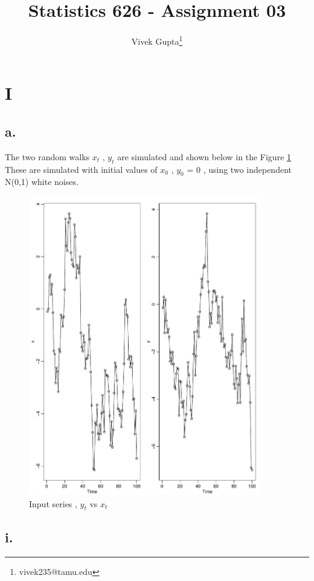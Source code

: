\documentclass{article}
\title{Statistics 626 - Assignment 03}
\author{Vivek Gupta\thanks{vivek235@tamu.edu}}
\affil{Department of Statistics, Texas A \& M University}
\begin{document}
	\maketitle
	\newpage 


\section{I}

\subsection{a.}
The two random walks $x_t$ , $y_t$ are simulated and shown below in the Figure \ref{fig1:input-series}
These are simulated with initial values of $x_0$ , $y_0$ = 0 , using two independent N(0,1) white noises.

\begin{figure}
	\centering
	\includegraphics[width=0.9\textwidth]{Parta1}
	\caption{Input series , $y_t$ vs $x_t$}
	\label{fig1:input-series}
\end{figure}

\subsection{i.}
\end{document}
